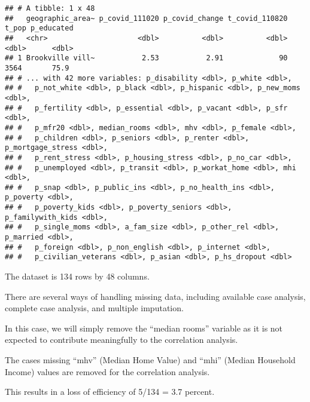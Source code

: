 \documentclass[
]{article}
\newenvironment{Shaded}{\begin{snugshade}}{\end{snugshade}}
\newcommand{\CommentTok}[1]{\textcolor[rgb]{0.56,0.35,0.01}{\textit{#1}}}
\newcommand{\KeywordTok}[1]{\textcolor[rgb]{0.13,0.29,0.53}{\textbf{#1}}}
\newcommand{\NormalTok}[1]{#1}
\newcommand{\OperatorTok}[1]{\textcolor[rgb]{0.81,0.36,0.00}{\textbf{#1}}}
\newcommand{\StringTok}[1]{\textcolor[rgb]{0.31,0.60,0.02}{#1}}
\begin{document}
\begin{Shaded}
\end{Shaded}

\begin{verbatim}
## # A tibble: 1 x 48
##   geographic_area~ p_covid_111020 p_covid_change t_covid_110820 t_pop p_educated
##   <chr>                     <dbl>          <dbl>          <dbl> <dbl>      <dbl>
## 1 Brookville vill~           2.53           2.91             90  3564       75.9
## # ... with 42 more variables: p_disability <dbl>, p_white <dbl>,
## #   p_not_white <dbl>, p_black <dbl>, p_hispanic <dbl>, p_new_moms <dbl>,
## #   p_fertility <dbl>, p_essential <dbl>, p_vacant <dbl>, p_sfr <dbl>,
## #   p_mfr20 <dbl>, median_rooms <dbl>, mhv <dbl>, p_female <dbl>,
## #   p_children <dbl>, p_seniors <dbl>, p_renter <dbl>, p_mortgage_stress <dbl>,
## #   p_rent_stress <dbl>, p_housing_stress <dbl>, p_no_car <dbl>,
## #   p_unemployed <dbl>, p_transit <dbl>, p_workat_home <dbl>, mhi <dbl>,
## #   p_snap <dbl>, p_public_ins <dbl>, p_no_health_ins <dbl>, p_poverty <dbl>,
## #   p_poverty_kids <dbl>, p_poverty_seniors <dbl>, p_familywith_kids <dbl>,
## #   p_single_moms <dbl>, a_fam_size <dbl>, p_other_rel <dbl>, p_married <dbl>,
## #   p_foreign <dbl>, p_non_english <dbl>, p_internet <dbl>,
## #   p_civilian_veterans <dbl>, p_asian <dbl>, p_hs_dropout <dbl>
\end{verbatim}

The dataset is 134 rows by 48 columns.

There are several ways of handling missing data, including available
case analysis, complete case analysis, and multiple imputation.

In this case, we will simply remove the ``median rooms'' variable as it
is not expected to contribute meaningfully to the correlation analysis.

The cases missing ``mhv'' (Median Home Value) and ``mhi'' (Median
Household Income) values are removed for the correlation analysis.

This results in a loss of efficiency of 5/134 = 3.7 percent.

\begin{Shaded}
\end{Shaded}
\end{document}
